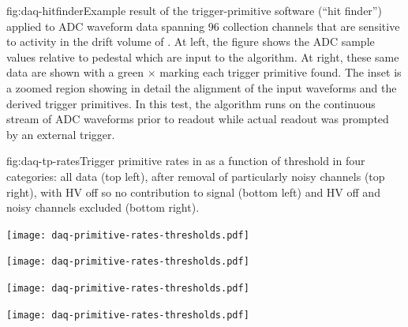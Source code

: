 \begin{dunefigure}{fig:daq-hitfinder}{Example result of the trigger-primitive software (``hit finder'') applied to ADC waveform data spanning 96 collection channels that are sensitive to activity in the drift volume of . 
    At left, the figure shows the ADC sample values relative to pedestal which are input to the algorithm. 
    At right, these same data are shown with a green $\times$ marking each trigger primitive found. 
    The inset is a zoomed region showing in detail the alignment of the input waveforms and the derived trigger primitives.
    In this test, the algorithm runs on the continuous stream of ADC waveforms prior to readout while actual readout was prompted by an external trigger.}
\end{dunefigure}

\begin{dunefigure}{fig:daq-tp-rates}{Trigger primitive rates in  as a function of threshold in four categories: all data (top left),  after removal of particularly noisy channels (top right), with HV off so no contribution to signal (bottom left) and HV off and noisy channels excluded (bottom right).}
  \begin{minipage}[b]{0.5\linewidth}
    \begin{center}
      \texttt{[image: daq-primitive-rates-thresholds.pdf]}

      \texttt{[image: daq-primitive-rates-thresholds.pdf]}
    \end{center}
  \end{minipage}%
  \begin{minipage}[b]{0.5\linewidth}
    \begin{center}
      \texttt{[image: daq-primitive-rates-thresholds.pdf]}

      \texttt{[image: daq-primitive-rates-thresholds.pdf]}
    \end{center}
  \end{minipage}

\end{dunefigure}


